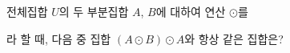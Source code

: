 전체집합 $U$의 두 부분집합 $A$, $B$에 대하여 연산 $\odot$를\par\smallskip{}\par\smallskip\noindent 라 할 때, 다음 중 집합 $(A\odot B)\odot A$와 항상 같은 집합은?
